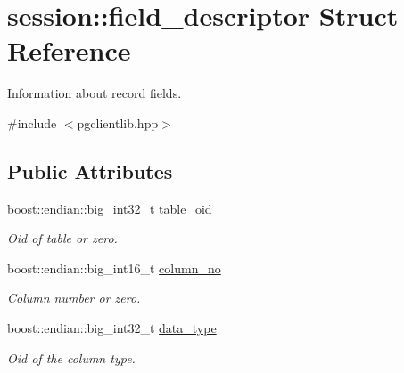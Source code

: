 \hypertarget{structsession_1_1field__descriptor}{}\section{session\+:\+:field\+\_\+descriptor Struct Reference}
\label{structsession_1_1field__descriptor}


Information about record fields.  




{\ttfamily \#include $<$pgclientlib.\+hpp$>$}

\subsection*{Public Attributes}
\begin{DoxyCompactItemize}
\item 
\mbox{\label{structsession_1_1field__descriptor_a9c3c410c05d378d0926d224ba5f7f6bf}} 
boost\+::endian\+::big\+\_\+int32\+\_\+t \hyperlink{structsession_1_1field__descriptor_a9c3c410c05d378d0926d224ba5f7f6bf}{table\+\_\+oid}
\begin{DoxyCompactList}\small\item\em Oid of table or zero. \end{DoxyCompactList}\item 
\mbox{\label{structsession_1_1field__descriptor_ab059776acbfe28251374d68d751b41c4}} 
boost\+::endian\+::big\+\_\+int16\+\_\+t \hyperlink{structsession_1_1field__descriptor_ab059776acbfe28251374d68d751b41c4}{column\+\_\+no}
\begin{DoxyCompactList}\small\item\em Column number or zero. \end{DoxyCompactList}\item 
\mbox{\label{structsession_1_1field__descriptor_acc41ca82d0fb9b5898cc41bc4052b936}} 
boost\+::endian\+::big\+\_\+int32\+\_\+t \hyperlink{structsession_1_1field__descriptor_acc41ca82d0fb9b5898cc41bc4052b936}{data\+\_\+type}
\begin{DoxyCompactList}\small\item\em Oid of the column type. \end{DoxyCompactList}\item 

\end{DoxyCompactItemize}
